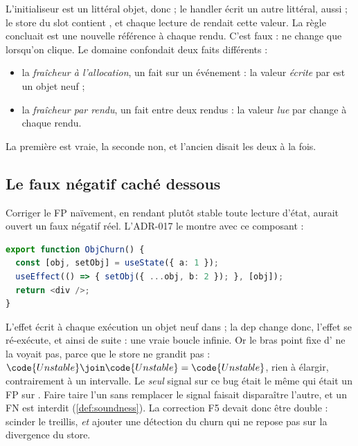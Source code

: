 L'initialiseur est un littéral objet, donc  ; le handler écrit
un autre littéral,  aussi ; le store du slot contient
, et chaque lecture de  rendait cette valeur. La
règle concluait \og {} est une nouvelle référence à chaque
rendu\fg{}. C'est faux :  ne change que lorsqu'on clique. Le
domaine confondait deux faits différents :
\begin{itemize}
  \item la \emph{fraîcheur à l'allocation}, un fait sur un événement : la
    valeur \emph{écrite} par  est un objet neuf ;
  \item la \emph{fraîcheur par rendu}, un fait entre deux rendus : la valeur
    \emph{lue} par  change à chaque rendu.
\end{itemize}
La première est vraie, la seconde non, et l'ancien  disait
les deux à la fois.

\subsection{Le faux négatif caché dessous}

Corriger le FP \og naïvement\fg{}, en rendant \og plutôt stable\fg{} toute
lecture d'état, aurait ouvert un faux négatif réel. L'ADR-017 le montre
avec ce composant :

\begin{lstlisting}[language=TypeScript,caption={Une boucle de churn d'objet (\file{/tmp/ch10/stability.tsx}, extrait)},label={lst:statevalue-stabilite-objchurn}]
export function ObjChurn() {
  const [obj, setObj] = useState({ a: 1 });
  useEffect(() => { setObj({ ...obj, b: 2 }); }, [obj]);
  return <div />;
}
\end{lstlisting}

L'effet écrit à chaque exécution un objet neuf dans  ; la dep
 change donc, l'effet se ré-exécute, et ainsi de suite : une vraie
boucle infinie. Or le bras point fixe d' ne la voyait
pas, parce que le store ne grandit pas : $\code{Unstable} \join
\code{Unstable} = \code{Unstable}$, rien à élargir, contrairement à un
intervalle. Le \emph{seul} signal sur ce bug était le même \Warning{}
 qui était un FP sur .
Faire taire l'un sans remplacer le signal faisait disparaître l'autre, et
un FN est interdit (\cref{def:soundness}). La correction F5 devait donc être
double : scinder le treillis, \emph{et} ajouter une détection du churn qui
ne repose pas sur la divergence du store.

